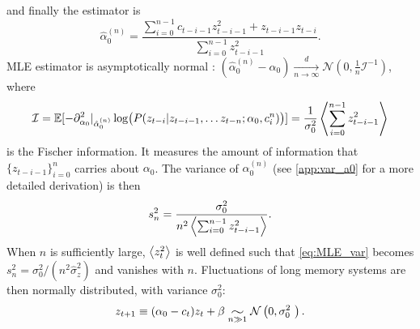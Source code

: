 \documentclass[FinalReport.tex]{subfiles}
\begin{document}
and finally the estimator is 
\begin{equation}\label{eq:controller_mle_n}
	\hat{\alpha}_0^{(n)}=\frac{\sum_{i=0}^{n-1}c_{t-i-1}z_{t-i-1}^2+z_{t-i-1}z_{t-i}}{\sum_{i=0}^{n-1}z_{t-i-1}^2}.
\end{equation}
MLE estimator is asymptotically normal \cite{CoxHink74}: $(\hat{\alpha}_0^{(n)}-\alpha_0)\underset{n\rightarrow\infty}{\stackrel{d}{\longrightarrow}}\mathcal{N}\left(0,\frac{1}{n}\mathcal{I}^{-1}\right)$, where 
\begin{equation}\label{eq:MLE_var}
	 \mathcal{I}=\mathbb{E}[-\partial^2_{\alpha_0}\vert_{\hat{\alpha}_0^{(n)}} \log\bigl(P(z_{t-i}\vert z_{t-i-1},\dots z_{t-n};\alpha_0,c_i^n)\bigr)]=\frac{1}{\sigma_0^2}\expval{\sum_{i=0}^{n-1}z^2_{t-i-1}}
\end{equation} 
is the Fischer information. It measures the amount of information that $\{z_{t-i-1}\}_{i=0}^{n}$ carries about $\alpha_0$. The variance of $\hat{\alpha}_0^{(n)}$ (see \autoref{app:var_a0} for a more detailed derivation) is then
\begin{equation}\label{eq:MLE_var}
	s_n^2=\frac{\sigma_0^2}{n^2\expval{\sum_{i=0}^{n-1}z^2_{t-i-1}}}.
\end{equation}
When $n$ is sufficiently large, $\expval{z_t^2}$ is well defined such that \eqref{eq:MLE_var} becomes $s_n^2=\sigma_0^2/(n^2 \hat{\sigma}_z^2)$ and
vanishes with $n$. Fluctuations of long memory systems are then normally distributed, with variance $\sigma_0^2$:
\begin{equation}
	z_{t+1}\equiv(\alpha_0-c_t)z_t+\beta \widesim{n\gg 1} \mathcal{N}\left(0,\sigma_0^2 \right).
\end{equation}

\def\longz{8.74}
\def\explongz{-4}
\def\longvarz{0.81}
\def\longmaxz{0}
\end{document}
